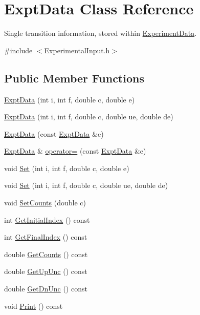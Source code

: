 \hypertarget{classExptData}{\section{Expt\-Data Class Reference}
\label{classExptData}
}


Single transition information, stored within \hyperlink{classExperimentData}{Experiment\-Data}.  




{\ttfamily \#include $<$Experimental\-Input.\-h$>$}

\subsection*{Public Member Functions}
\begin{DoxyCompactItemize}
\item 
\hyperlink{classExptData_a45516a1c812eb98a2c9161822fdb5bdc}{Expt\-Data} (int i, int f, double c, double e)
\item 
\hyperlink{classExptData_abe44c3dd192ecaed02dcbe9c251c30f1}{Expt\-Data} (int i, int f, double c, double ue, double de)
\item 
\hyperlink{classExptData_a030026d0796125e06287555160752abe}{Expt\-Data} (const \hyperlink{classExptData}{Expt\-Data} \&e)
\item 
\hyperlink{classExptData}{Expt\-Data} \& \hyperlink{classExptData_abaec133873ceee3e02d77951451bcdc6}{operator=} (const \hyperlink{classExptData}{Expt\-Data} \&e)
\item 
void \hyperlink{classExptData_a9f1982e8e8471bf8b99017d60e0bdd02}{Set} (int i, int f, double c, double e)
\item 
void \hyperlink{classExptData_aabe3d956a3235307f474ab08b78c1fcb}{Set} (int i, int f, double c, double ue, double de)
\item 
void \hyperlink{classExptData_ad624ee2122e68682cc169837c1ca8982}{Set\-Counts} (double c)
\item 
int \hyperlink{classExptData_a706e630776c6a7631bf9262ad1a80106}{Get\-Initial\-Index} () const 
\item 
int \hyperlink{classExptData_a0c78fa191eb42a996b54b626bc1cbfaf}{Get\-Final\-Index} () const 
\item 
double \hyperlink{classExptData_af1cb66118a2f20e87cc83168417ff5db}{Get\-Counts} () const 
\item 
double \hyperlink{classExptData_a8439a7e32034c37e59634166a107d324}{Get\-Up\-Unc} () const 
\item 
double \hyperlink{classExptData_a127c06dc6111a694bbe07bd7de9f9dd8}{Get\-Dn\-Unc} () const 
\item 
void \hyperlink{classExptData_a68d25d343b572b676a14fb3d79b211ae}{Print} () const 
\end{DoxyCompactItemize}


